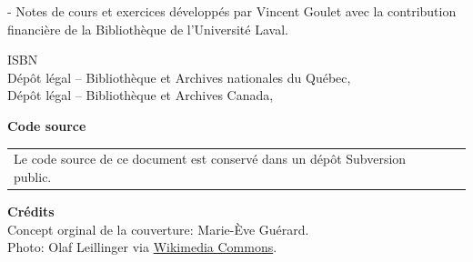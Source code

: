 \begin{adjustwidth*}{\unitlength}{-\unitlength}
  Notes de cours et exercices développés par Vincent Goulet avec la
  contribution financière de la Bibliothèque de l'Université Laval.
  \vfill

  ISBN {\ISBN} \\
  Dépôt légal -- Bibliothèque et Archives nationales du Québec, {\year} \\
  Dépôt légal -- Bibliothèque et Archives Canada, {\year}
  \vfill

  \textbf{Code source} \\[4pt]
  \begin{tabularx}{1.0\linewidth}{@{}Xl@{}}
    Le code source de ce document est conservé dans un dépôt
    Subversion public. &
                         \raisebox{-7pt}{%
                         \href{https://svn.fsg.ulaval.ca/svn-pub/vgoulet/formation_latex/}{%
                         \browsebutton}}
  \end{tabularx}
  \vfill

  \textbf{Crédits} \\
  Concept orginal de la couverture: Marie-Ève Guérard. \\
  Photo: Olaf Leillinger via
  \href{https://commons.wikimedia.org/wiki/File:Suricata.suricatta.6861.jpg}{%
    Wikimedia Commons}.
\end{adjustwidth*}
\endgroup

